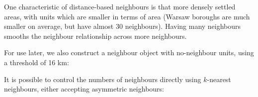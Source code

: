 \documentclass[]{book}
\newenvironment{Shaded}{\begin{snugshade}}{\end{snugshade}}
\newcommand{\CommentTok}[1]{\textcolor[rgb]{0.56,0.35,0.01}{\textit{#1}}}
\newcommand{\DataTypeTok}[1]{\textcolor[rgb]{0.13,0.29,0.53}{#1}}
\newcommand{\DecValTok}[1]{\textcolor[rgb]{0.00,0.00,0.81}{#1}}
\newcommand{\KeywordTok}[1]{\textcolor[rgb]{0.13,0.29,0.53}{\textbf{#1}}}
\newcommand{\NormalTok}[1]{#1}
\newcommand{\OperatorTok}[1]{\textcolor[rgb]{0.81,0.36,0.00}{\textbf{#1}}}
\newcommand{\StringTok}[1]{\textcolor[rgb]{0.31,0.60,0.02}{#1}}
\begin{document}
\begin{Shaded}
\end{Shaded}

One characteristic of distance-based neighbours is that more densely settled areas, with units which are smaller in terms of area (Warsaw boroughs are much smaller on average, but have almost 30 neighbours). Having many neighbours smooths the neighbour relationship across more neighbours.

For use later, we also construct a neighbour object with no-neighbour units, using a threshold of 16 km:

\begin{Shaded}
\end{Shaded}

It is possible to control the numbers of neighbours directly using \(k\)-nearest neighbours, either accepting asymmetric neighbours:

\begin{Shaded}
\end{Shaded}
\end{document}
